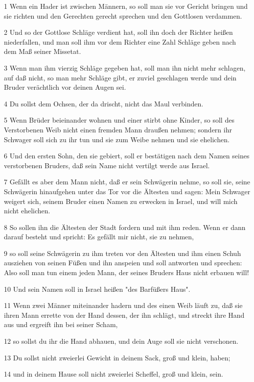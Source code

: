 \par 1 Wenn ein Hader ist zwischen Männern, so soll man sie vor Gericht bringen und sie richten und den Gerechten gerecht sprechen und den Gottlosen verdammen.
\par 2 Und so der Gottlose Schläge verdient hat, soll ihn doch der Richter heißen niederfallen, und man soll ihm vor dem Richter eine Zahl Schläge geben nach dem Maß seiner Missetat.
\par 3 Wenn man ihm vierzig Schläge gegeben hat, soll man ihn nicht mehr schlagen, auf daß nicht, so man mehr Schläge gibt, er zuviel geschlagen werde und dein Bruder verächtlich vor deinen Augen sei.
\par 4 Du sollst dem Ochsen, der da drischt, nicht das Maul verbinden.
\par 5 Wenn Brüder beieinander wohnen und einer stirbt ohne Kinder, so soll des Verstorbenen Weib nicht einen fremden Mann draußen nehmen; sondern ihr Schwager soll sich zu ihr tun und sie zum Weibe nehmen und sie ehelichen.
\par 6 Und den ersten Sohn, den sie gebiert, soll er bestätigen nach dem Namen seines verstorbenen Bruders, daß sein Name nicht vertilgt werde aus Israel.
\par 7 Gefällt es aber dem Mann nicht, daß er sein Schwägerin nehme, so soll sie, seine Schwägerin hinaufgehen unter das Tor vor die Ältesten und sagen: Mein Schwager weigert sich, seinem Bruder einen Namen zu erwecken in Israel, und will mich nicht ehelichen.
\par 8 So sollen ihn die Ältesten der Stadt fordern und mit ihm reden. Wenn er dann darauf besteht und spricht: Es gefällt mir nicht, sie zu nehmen,
\par 9 so soll seine Schwägerin zu ihm treten vor den Ältesten und ihm einen Schuh ausziehen von seinen Füßen und ihn anspeien und soll antworten und sprechen: Also soll man tun einem jeden Mann, der seines Bruders Haus nicht erbauen will!
\par 10 Und sein Namen soll in Israel heißen "des Barfüßers Haus".
\par 11 Wenn zwei Männer miteinander hadern und des einen Weib läuft zu, daß sie ihren Mann errette von der Hand dessen, der ihn schlägt, und streckt ihre Hand aus und ergreift ihn bei seiner Scham,
\par 12 so sollst du ihr die Hand abhauen, und dein Auge soll sie nicht verschonen.
\par 13 Du sollst nicht zweierlei Gewicht in deinem Sack, groß und klein, haben;
\par 14 und in deinem Hause soll nicht zweierlei Scheffel, groß und klein, sein.

